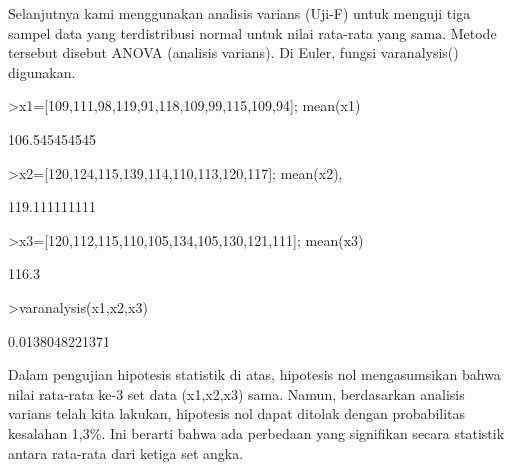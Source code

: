 \documentclass[a4paper,10pt]{article}
\begin{document}
\begin{eulernotebook}
\begin{eulercomment}
\begin{eulercomment}
\begin{eulercomment}
\begin{eulercomment}
\begin{eulercomment}
\begin{eulercomment}
\begin{eulercomment}
\begin{eulercomment}
\begin{eulercomment}
\begin{eulercomment}
\begin{eulercomment}
\begin{eulercomment}
\begin{eulercomment}
\begin{eulercomment}
\begin{eulercomment}
\begin{eulercomment}
\begin{eulercomment}
\begin{eulercomment}
\begin{eulercomment}
Selanjutnya kami menggunakan analisis varians (Uji-F) untuk menguji
tiga sampel data yang terdistribusi normal untuk nilai rata-rata yang
sama. Metode tersebut disebut ANOVA (analisis varians). Di Euler,
fungsi varanalysis() digunakan.
\end{eulercomment}
\begin{eulerprompt}
>x1=[109,111,98,119,91,118,109,99,115,109,94]; mean(x1)
\end{eulerprompt}
\begin{euleroutput}
  106.545454545
\end{euleroutput}
\begin{eulerprompt}
>x2=[120,124,115,139,114,110,113,120,117]; mean(x2),
\end{eulerprompt}
\begin{euleroutput}
  119.111111111
\end{euleroutput}
\begin{eulerprompt}
>x3=[120,112,115,110,105,134,105,130,121,111]; mean(x3)
\end{eulerprompt}
\begin{euleroutput}
  116.3
\end{euleroutput}
\begin{eulerprompt}
>varanalysis(x1,x2,x3)
\end{eulerprompt}
\begin{euleroutput}
  0.0138048221371
\end{euleroutput}
\begin{eulercomment}
Dalam pengujian hipotesis statistik di atas, hipotesis nol
mengasumsikan bahwa nilai rata-rata ke-3 set data (x1,x2,x3) sama.
Namun, berdasarkan analisis varians telah kita lakukan, hipotesis nol
dapat ditolak dengan probabilitas kesalahan 1,3\%. Ini berarti bahwa
ada perbedaan yang signifikan secara statistik antara rata-rata dari
ketiga set angka.
\end{eulercomment}
\begin{eulercomment}


\end{eulercomment}
\end{eulercomment}
\end{eulercomment}
\end{eulercomment}
\end{eulercomment}
\end{eulercomment}
\end{eulercomment}
\end{eulercomment}
\end{eulercomment}
\end{eulercomment}
\end{eulercomment}
\end{eulercomment}
\end{eulercomment}
\end{eulercomment}
\end{eulercomment}
\end{eulercomment}
\end{eulercomment}
\end{eulercomment}
\end{eulercomment}
\end{eulernotebook}
\end{document}
